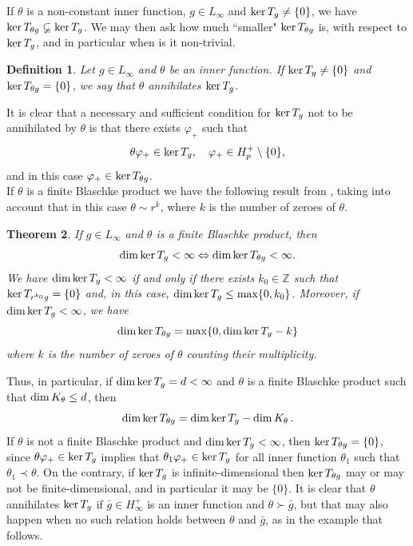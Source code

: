 \documentclass[11pt]{article}
\def\ZZ{\mathbb{Z}}
\def\dim{\mathop{\rm dim}\nolimits}
\def\ker{\mathop{\rm ker}\nolimits}
\renewcommand\phi{\varphi}
\newtheorem{thm}{Theorem}[section]
\newtheorem{defn}[thm]{Definition}
\numberwithin{equation}{section}
\def\beq{\begin{equation}}
\def\eeq{\end{equation}}
\begin{document}
If $\theta$ is a non-constant inner function, $g\in L_\infty$ and $\ker T_g \neq \left \{0\right\}$, we have $\ker T_{\theta g} \varsubsetneq \ker T_g$. We may then ask how 
much ``smaller" $\ker T_{\theta g}$ is, with respect to $\ker T_g$, and in particular when is it non-trivial.

\begin{defn} Let $g \in L_\infty$ and $\theta$ be an inner function. If $\ker T_g\neq \{0\}$  and $\ker T_{\theta g}=\{0\}$, we say that \emph{$\theta$ annihilates $\ker T_g$.}
\end{defn}

It is clear that a necessary and sufficient condition for $\ker T_g$ not to be annihilated by $\theta$ is that there exists $\phi_+$ such that
\beq\label{6.3}
 \theta \phi_+ \in \ker T_g, \ \ \ \phi_+ \in H_p^+\setminus\{0\},
\eeq
and in this case $\phi_+ \in \ker T_{\theta g}$.\\

If $\theta$ is a finite Blaschke product we have the following result from \cite{BCD}, taking into account that in this case $\theta\sim r^k$, where $k$ is the number of zeroes of $\theta$.

\begin{thm}\label{thm:6.3}
If $g \in L_\infty$ and $\theta$ is a finite Blaschke product, then
\beq\label{6.4}
\dim \ker T_g < \infty \Leftrightarrow \dim \ker T_{\theta g} < \infty.
\eeq
We have $\dim \ker T_g < \infty$ if and only if there exists $k_0   \in \ZZ$ such that $\ker T_{r^{k_0}g}=\{0\}$ and, in this case, $\dim \ker T_g \leq \max \{0,k_0\}$. Moreover, if $\dim \ker T_g < \infty$, we have
\beq\label{6.5}
\dim \ker T_{\theta g} =\max \{0, \dim \ker T_g - k \}
\eeq
 where $k$ is the number of zeroes of $\theta$ counting their multiplicity.
\end{thm}

 Thus, in particular, if $\dim \ker T_g=d< \infty$ and $\theta$ is a finite Blaschke product such that $\dim K_\theta \leq d$, then
 \[
 \dim \ker T_{\theta g} = \dim \ker T_g - \dim K_\theta\,.
 \]
   If $\theta$ is not a finite Blaschke product and $\dim\ker T_g < \infty$, then $\ker T_{\theta g}=\{0\}$, since $\theta \phi_+ \in \ker T_g$ implies that $\theta_1 \phi_+ \in \ker T_g$ for all inner function $\theta_1$ such that $\theta_1 \prec \theta$. On the contrary, if $\ker T_g$ is infinite-dimensional then
$\ker T_{\theta g}$ may or may not be finite-dimensional, and in particular it may be $\{0\}$. It is clear that $\theta$ annihilates $\ker T_g$ if $\bar{g}\in H_\infty^+$ is an inner function and $\theta \succ \bar{g}$, but that may also happen when no such relation holds between $\theta$ and $\bar{g}$, as in the example that follows.
\end{document}
